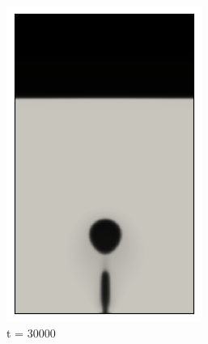 \begin{figure}[H]
\begin{subfigure}{0.25\textwidth}
		\includegraphics[width=\linewidth]{figs/cap4/bb_760_d30}
		\caption{t = 30000}
		\label{fig:5}
	\end{subfigure}\hfil 
	\begin{subfigure}{0.25\textwidth}

\end{subfigure}
\end{figure}
